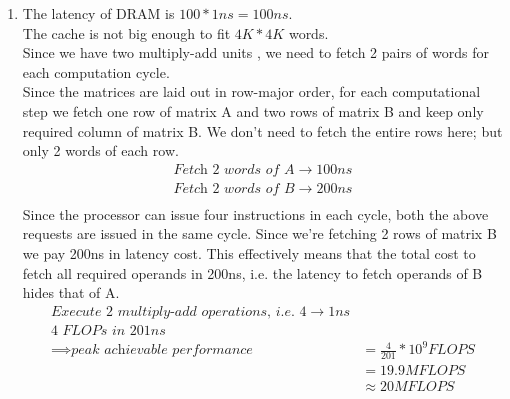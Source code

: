 \documentclass{article}
\begin{document}
\begin{enumerate}[label=\Large\textbf{\arabic*}.]
\item
	The latency of DRAM is $100 * 1 ns = 100 ns$. \\
	The cache is not big enough to fit $4K * 4K$ words. \\
	Since we have two multiply-add units , we need to fetch 2 pairs of words for each computation cycle. \\
	Since the matrices are laid out in row-major order, for each computational step we fetch one row of matrix A and two rows of matrix B and keep only required column of matrix B. We don't need to fetch the entire rows here; but only 2 words of each row.
	\begin{align*}
		\textit{Fetch 2 words of A} \to 100ns \\
		\textit{Fetch 2 words of B} \to 200ns \\
	\end{align*}
	Since the processor can issue four instructions in each cycle, both the above requests are issued in the same cycle. Since we're fetching 2 rows of matrix B we pay 200ns in latency cost. This effectively means that the total cost to fetch all required operands in 200ns, i.e. the latency to fetch operands of B hides that of A.
	\begin{align*}
		\textit{Execute 2 multiply-add operations, i.e. 4} \to 1ns \\
		\textit{4 FLOPs in } 201ns \\
		\implies \textit{peak achievable performance} &= \frac{4}{201} * 10^9 FLOPS \\
		&= 19.9 MFLOPS \\
		&\approx 20 MFLOPS
	\end{align*}	
	

\end{enumerate}
\end{document}
